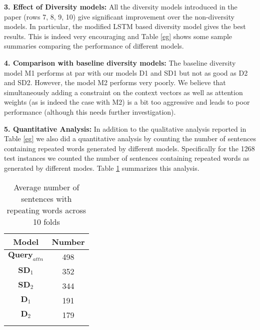 \documentclass[11pt]{article}
\begin{document}
\noindent \textbf{3. Effect of Diversity models:} All the diversity models introduced in the paper (rows 7, 8, 9, 10) give significant improvement over the non-diversity models. In particular, the modified LSTM based diversity model gives the best results. This is indeed very encouraging and Table \ref{eg} shows some sample summaries comparing the performance of different models.

\noindent \textbf{4. Comparison with baseline diversity models:} The baseline diversity model M1 performs at par with our models D1 and SD1 but not as good as D2 and SD2. However, the model M2 performs very poorly. We believe that simultaneously adding a constraint on the context vectors as well as attention weights (as is indeed the case with M2) is a bit too aggressive and leads to poor performance (although this needs further investigation).

\noindent \textbf{5. Quantitative Analysis:} In addition to the qualitative analysis reported in Table \ref{eg} we also did a quantitative analysis by counting the number of sentences containing repeated words generated by different models. Specifically for the 1268 test instances we counted the number of sentences containing repeated words as generated by different modes. Table \ref{table_rep} summarizes this analysis. 
\begin{center}
\begin{table}[!tbh]
\begin{center}
\begin{tabular}{cc}
\hline
Model & Number\\
\hline
\textbf{$\mathbf{Query}_{attn}$} & 498\\
\textbf{$\mathbf{SD}_{1}$} & 352  \\
\textbf{$\mathbf{SD}_{2}$} & 344 \\
\textbf{$\mathbf{D}_{1}$} & 191 \\
\textbf{$\mathbf{D}_{2}$} & 179\\ 
\hline
&\\
\end{tabular}
\end{center}
\caption{Average number of sentences with repeating words across 10 folds}
\label{table_rep}
\end{table}
\end{center}
\end{document}
